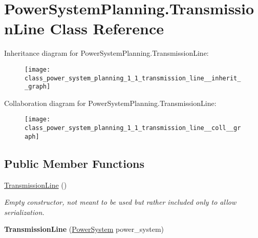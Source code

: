 \hypertarget{class_power_system_planning_1_1_transmission_line}{}\section{Power\+System\+Planning.\+Transmission\+Line Class Reference}
\label{class_power_system_planning_1_1_transmission_line}


Inheritance diagram for Power\+System\+Planning.\+Transmission\+Line\+:\nopagebreak
\begin{figure}[H]
\begin{center}
\leavevmode
\texttt{[image: class\_power\_system\_planning\_1\_1\_transmission\_line\_\_inherit\_\_graph]}
\end{center}
\end{figure}


Collaboration diagram for Power\+System\+Planning.\+Transmission\+Line\+:\nopagebreak
\begin{figure}[H]
\begin{center}
\leavevmode
\texttt{[image: class\_power\_system\_planning\_1\_1\_transmission\_line\_\_coll\_\_graph]}
\end{center}
\end{figure}
\subsection*{Public Member Functions}
\begin{DoxyCompactItemize}
\item 
\hyperlink{class_power_system_planning_1_1_transmission_line_a6031223d4ebe71e02ee01908b92f4789}{Transmission\+Line} ()
\begin{DoxyCompactList}\small\item\em Empty constructor, not meant to be used but rather included only to allow serialization. \end{DoxyCompactList}\item 
{\bfseries Transmission\+Line} (\hyperlink{class_power_system_planning_1_1_power_system}{Power\+System} power\+\_\+system)\hypertarget{class_power_system_planning_1_1_transmission_line_a077143e93db30e381298931ba0fbd3dc}{}\label{class_power_system_planning_1_1_transmission_line_a077143e93db30e381298931ba0fbd3dc}

\end{DoxyCompactItemize}
